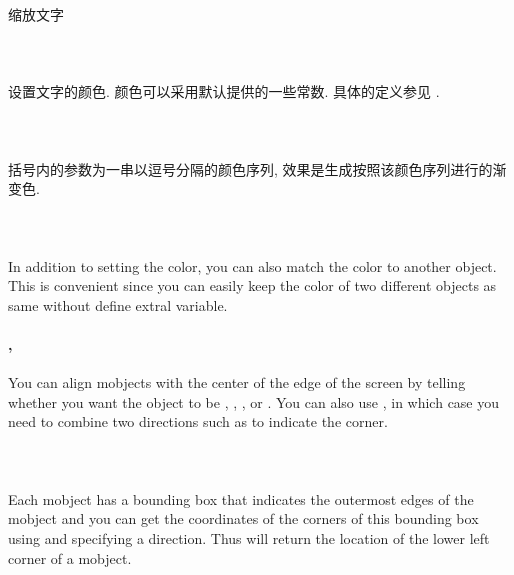         \paragraph{ \\}
            \hspace*{2em}缩放文字

        \paragraph{ \\}
            \hspace*{2em}设置文字的颜色. 颜色可以采用默认提供的一些常数. 具体的定义参见 .

        \paragraph{ \\}
            \hspace*{2em}括号内的参数为一串以逗号分隔的颜色序列, 效果是生成按照该颜色序列进行的渐变色.

        \paragraph{ \\}
            \hspace*{2em}In addition to setting the color, you can also match the color to another object. This is convenient since you can easily keep the color of two different objects as same without define extral variable.

        \paragraph{,  \\}
            \hspace*{2em}You can align mobjects with the center of the edge of the screen by telling  whether you want the object to be , , , or . You can also use , in which case you need to combine two directions such as  to indicate the corner.

        \paragraph{ \\}
            \hspace*{2em}Each mobject has a bounding box that indicates the outermost edges of the mobject and you can get the coordinates of the corners of this bounding box using  and specifying a direction. Thus  will return the location of the lower left corner of a mobject.

